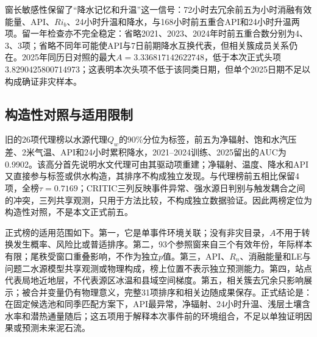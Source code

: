 窗长敏感性保留了“降水记忆和升温”这一信号：72小时去冗余前五为小时消融有效能量、API、$Ri_b$、24小时升温和降水，与168小时前五重合API和24小时升温两项。留一年检查亦不完全稳定：省略2021、2023、2024年时前五重合数分别为4、3、3项；省略不同年可能使API与7日前期降水互换代表，但相关簇成员关系仍在。2025年同历日对照的最大$A=3.336817142622748$，低于本次正式头项3.8290425800714973；这表明本次头项不低于该同类日期，但单个2025日期不足以构成确证非灾样本。

\subsection{构造性对照与适用限制}
旧的26项代理榜以水源代理$Q_w$的90\%分位为标签，前五为净辐射、饱和水汽压差、2米气温、API和24小时累积降水，2021--2024训练、2025留出的AUC为0.9902。该高分首先说明水文代理可由其驱动项重建；净辐射、温度、降水和API又直接参与标签或供水构造，其排序不构成独立发现。与代理榜前五相比保留4项，全榜$\tau=0.7169$；CRITIC三列反映事件异常、强水源日判别与触发耦合之间的冲突，三列共享观测，只用于方法比较，不构成独立数据验证。因此两榜定位为构造性对照，不是本文正式前五。

正式榜的适用范围如下。第一，它是单事件环境关联；没有非灾目录，$A$不用于转换发生概率、风险比或普适排序。第二，93个参照窗来自三个有效年份，年际样本有限；尾秩受窗口重叠影响，不作为独立$p$值。第三，API、$R_n$、消融能量和LE与问题二水源模型共享观测或物理构成，榜上位置不表示独立预测能力。第四，站点代表局地近地层，不代表源区冰温和县域空间梯度。第五，相关簇去冗余只影响展示；被合并变量仍有物理意义，完整31项排序和相关边随成果保存。正式结论是：在固定候选池和同季匹配方案下，API最异常，净辐射、24小时升温、浅层土壤含水率和潜热通量随后；这五项用于解释本次事件前的环境组合，不足以单独证明因果或预测未来泥石流。
